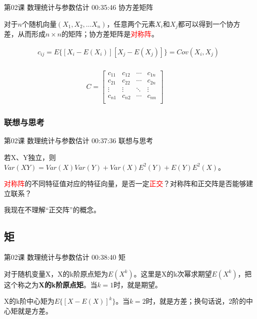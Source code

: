 \documentclass[UTF8]{ctexbook}
\begin{document}
第02课 数理统计与参数估计 00:35:46 协方差矩阵

对于$n$个随机向量$(X_{1},X_{2},\dots X_{n})$，任意两个元素$X_{i}$和$X_{j}$都可以得到一个协方差，从而形成$n \times n$的矩阵；协方差矩阵是\textcolor{red}{对称阵}。

\begin{equation}
\begin{aligned}
c_{ij}=E\{  [X_{i}-E(X_{i})][X_{j}-E(X_{j})]  \} = Cov(X_{i},X_{j}) \\
\end{aligned}
\end{equation}

\begin{equation}
\begin{aligned}
C=
\begin{bmatrix}
c_{11} & c_{12} & \cdots & c_{1n} \\
c_{21} & c_{22} & \cdots & c_{2n} \\
\vdots & \vdots & \ddots & \vdots \\
c_{n1} & c_{n2} & \cdots & c_{nn} \\
\end{bmatrix}\quad
\end{aligned}
\end{equation}

\subsubsection{联想与思考}

第02课 数理统计与参数估计 00:37:36 联想与思考

若X、Y独立，则$Var(XY)=Var(X)Var(Y)+Var(X)E^{2}(Y)+E(Y)E^{2}(X)$。

\textcolor{red}{对称阵}的不同特征值对应的特征向量，是否一定\textcolor{red}{正交}？对称阵和正交阵是否能够建立联系？

我现在不理解“正交阵”的概念。

\subsection{矩}

第02课 数理统计与参数估计 00:38:40 矩

对于随机变量X，X的k阶原点矩为$E(X^{k})$。这里是X的k次幂求期望$E(X^{k})$，把这个称之为\textbf{X的k阶原点矩}。当$k=1$时，就是期望。

X的k阶中心矩为$E\{  [X-E(X)]^{k} \}$。当$k=2$时，就是方差；换句话说，2阶的中心矩就是方差。
\end{document}
